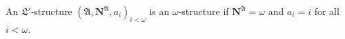An $\mathfrak{L}'$-structure $(\mathfrak{A}, \mathbf{N}^\mathfrak{A}, a_i)_{i < \omega}$ is an $\omega$-structure if $\mathbf{N}^\mathfrak{A} = \omega$ and $a_i = i$ for all $i < \omega$.
